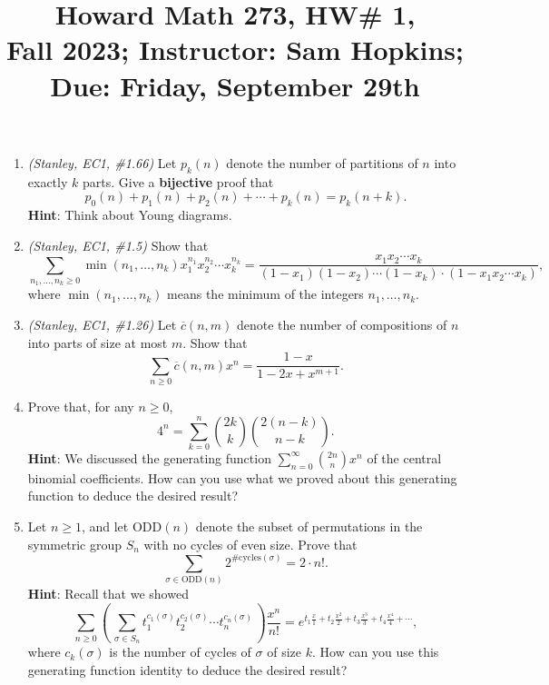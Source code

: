 \documentclass[11pt]{article}
\title{Howard Math 273, HW\# 1, \\ {\normalsize Fall 2023; Instructor: Sam Hopkins; Due: Friday, September 29th}}
\date{}
\begin{document}
\maketitle

\thispagestyle{empty}

\begin{enumerate}

\item \emph{(Stanley, EC1, \#1.66)} Let $p_k(n)$ denote the number of partitions of $n$ into exactly $k$ parts. Give a {\bf bijective} proof that
\[p_0(n)+p_1(n)+p_2(n)+\cdots + p_k(n) = p_k(n+k).\]
{\bf Hint}: Think about Young diagrams.

\item \emph{(Stanley, EC1, \#1.5)} Show that 
\[ \sum_{n_1,\ldots, n_k \geq 0} \min(n_1,\ldots,n_k) x_1^{n_1}x_2^{n_2}\cdots x_k^{n_k} = \frac{x_1x_2\cdots x_k}{(1-x_1)(1-x_2)\cdots(1-x_k) \cdot (1-x_1x_2\cdots x_k)}, \]
where $ \min(n_1,\ldots,n_k)$ means the minimum of the integers $n_1,\ldots,n_k$.

\item \emph{(Stanley, EC1, \#1.26)} Let $\overline{c}(n,m)$ denote the number of compositions of $n$ into parts of size at most $m$. Show that
\[ \sum_{n\geq 0} \overline{c}(n,m)x^n = \frac{1-x}{1-2x+x^{m+1}}.\]

\item Prove that, for any $n \geq 0$,
\[ 4^n = \sum_{k=0}^{n} \binom{2k}{k}\binom{2(n-k)}{n-k}. \]
{\bf Hint}: We discussed the generating function $\sum_{n=0}^{\infty} \binom{2n}{n}x^n$ of the central binomial coefficients. How can you use what we proved about this generating function to deduce the desired result?

\item Let $n \geq 1$, and let $\mathrm{ODD}(n)$ denote the subset of permutations in the symmetric group $S_n$ with no cycles of even size. Prove that
\[ \sum_{\sigma \in \mathrm{ODD}(n)} 2^{\#\mathrm{cycles}(\sigma)} = 2\cdot n!. \]
{\bf Hint}: Recall that we showed
\[ \sum_{n \geq 0}  \left( \, \sum_{\sigma\in S_n} t_1^{c_1(\sigma)} t_2^{c_2(\sigma)} \cdots t_n^{c_n(\sigma)} \, \right)  \frac{x^n}{n!} = e^{t_1 \frac{x}{1} + t_2\frac{x^2}{2} + t_3\frac{x^3}{3} + t_4\frac{x^4}{4} + \cdots},\]
where $c_k(\sigma)$ is the number of cycles of $\sigma$ of size $k$. How can you use this generating function identity to deduce the desired result?


\end{enumerate}
\end{document}
